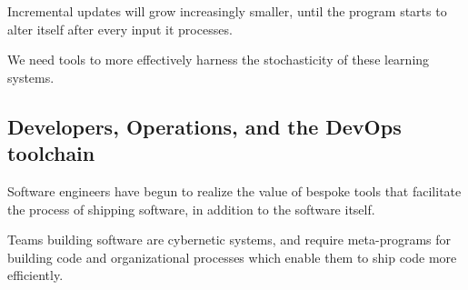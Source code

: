 \documentclass[12pt,initial,twoside,maitrise]{dms}
\numberwithin{equation}{section}
\numberwithin{table}{chapter}
\numberwithin{figure}{chapter}
\begin{document}
Incremental updates will grow increasingly smaller, until the program starts to alter itself after every input it processes.

We need tools to more effectively harness the stochasticity of these learning systems.

\subsection{Developers, Operations, and the DevOps toolchain}

Software engineers have begun to realize the value of bespoke tools that facilitate the process of shipping software, in addition to the software itself.

Teams building software are cybernetic systems, and require meta-programs for building code and organizational processes which enable them to ship code more efficiently.



\end{document}
